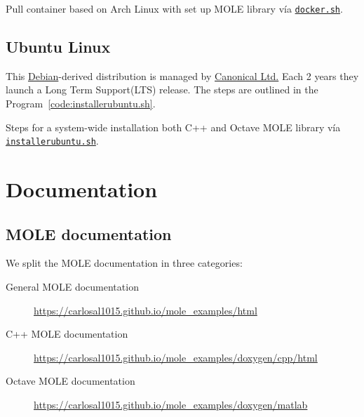 \begin{listing}[ht!]
	\tiny
	\centering
	\caption{Pull container based on Arch Linux with set up MOLE
		library vía \href{https://raw.githubusercontent.com/carlosal1015/mole_examples/main/tutorial/docker.sh}{\texttt{docker.sh}}.}
	\label{code:docker.sh}
\end{listing}

\section{Ubuntu Linux}

This \href{https://www.debian.org}{Debian}-derived distribution is
managed by \href{https://canonical.com}{Canonical Ltd.}
Each 2 years they launch a Long Term Support(LTS) release.
The steps are outlined in the Program~\ref{code:installerubuntu.sh}.

\begin{listing}[ht!]
	\tiny
	\centering
	\caption{Steps for a system-wide installation both C++ and Octave
		MOLE library vía \href{https://raw.githubusercontent.com/carlosal1015/mole_examples/main/tutorial/installerubuntu.sh}{\texttt{installerubuntu.sh}}.}
	\label{code:installerubuntu.sh}
\end{listing}

\chapter{Documentation}

\section{MOLE documentation}

We split the MOLE documentation in three categories:

\begin{description}
	\item[General MOLE documentation]

	      \url{https://carlosal1015.github.io/mole_examples/html}

	\item[C++ MOLE documentation]

	      \url{https://carlosal1015.github.io/mole_examples/doxygen/cpp/html}

	\item[Octave MOLE documentation]

	      \url{https://carlosal1015.github.io/mole_examples/doxygen/matlab}
\end{description}

